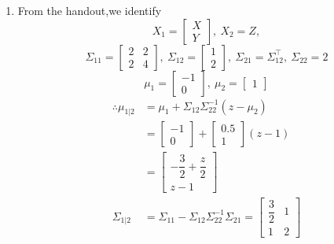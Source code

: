 \documentclass[letterpaper]{article}
\begin{document}
\begin{enumerate}
\setlength{\itemsep}{.1in}
\renewcommand{\labelenumi}{(\alph{enumi})}
\item From the handout,we identify
$$X_1=\left[\begin{array}{c} X \\Y\end{array} \right],~X_2=Z,$$
$$\Sigma_{11}=\left[\begin{array}{rr} 2& 2\\ 2 & 4\end{array} \right],~\Sigma_{12}=\left[\begin{array}{r} 1\\ 2\end{array} \right],~\Sigma_{21}=\Sigma_{12}^\top,~\Sigma_{22}=2$$
$$\mu_{1}=\left[\begin{array}{r} -1 \\ 0\end{array} \right],~\mu_{2}=\left[\begin{array}{r} 1\end{array}\right]$$
$$\begin{aligned}
\therefore \mu_{1|2}&=\mu_1+\Sigma_{12}\Sigma^{-1}_{22}(z-\mu_2) \\[2ex]
&=\left[\begin{array}{r} -1 \\ 0\end{array} \right]+\left[\begin{array}{c} 0.5 \\ 1\end{array} \right](z-1) \\
&=\left[\begin{array}{r} -\dfrac{3}{2}+\dfrac{z}{2} \\[2ex] z-1\end{array} \right] \\
\Sigma_{1|2}&=\Sigma_{11}-\Sigma_{12}\Sigma^{-1}_{22}\Sigma_{21}=\left[\begin{array}{cc} \dfrac{3}{2} & 1\\[2ex] 1 & 2\end{array} \right]
\end{aligned}$$


\end{enumerate}
\end{document}
